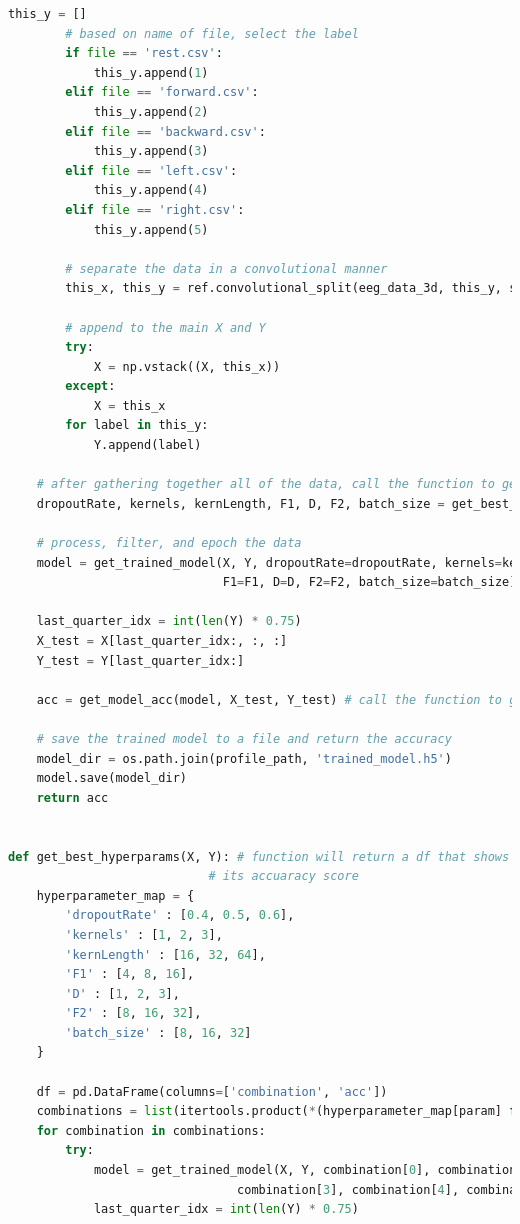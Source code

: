 \documentclass[conference]{IEEEtran}
\begin{document}
\begin{lstlisting}[language=Python, caption=Machine Learning Calls, label=ml_calls]
        this_y = []
        # based on name of file, select the label
        if file == 'rest.csv':
            this_y.append(1)
        elif file == 'forward.csv':
            this_y.append(2)
        elif file == 'backward.csv':
            this_y.append(3)
        elif file == 'left.csv':
            this_y.append(4)
        elif file == 'right.csv':
            this_y.append(5)

        # separate the data in a convolutional manner
        this_x, this_y = ref.convolutional_split(eeg_data_3d, this_y, samples_to_jump_by, num_samples, num_channels)

        # append to the main X and Y
        try:  
            X = np.vstack((X, this_x))
        except:
            X = this_x
        for label in this_y:
            Y.append(label)

    # after gathering together all of the data, call the function to get the best hyperparams
    dropoutRate, kernels, kernLength, F1, D, F2, batch_size = get_best_hyperparams(X, Y)
    
    # process, filter, and epoch the data 
    model = get_trained_model(X, Y, dropoutRate=dropoutRate, kernels=kernels, kernLength=kernLength,
                              F1=F1, D=D, F2=F2, batch_size=batch_size) # call the function to train the model
    
    last_quarter_idx = int(len(Y) * 0.75)
    X_test = X[last_quarter_idx:, :, :]
    Y_test = Y[last_quarter_idx:]
    
    acc = get_model_acc(model, X_test, Y_test) # call the function to get the acc

    # save the trained model to a file and return the accuracy
    model_dir = os.path.join(profile_path, 'trained_model.h5')
    model.save(model_dir)
    return acc


def get_best_hyperparams(X, Y): # function will return a df that shows every combination of hyperparam and 
                            # its accuaracy score
    hyperparameter_map = {
        'dropoutRate' : [0.4, 0.5, 0.6],
        'kernels' : [1, 2, 3],
        'kernLength' : [16, 32, 64],
        'F1' : [4, 8, 16],
        'D' : [1, 2, 3],
        'F2' : [8, 16, 32],
        'batch_size' : [8, 16, 32]
    }
    
    df = pd.DataFrame(columns=['combination', 'acc'])
    combinations = list(itertools.product(*(hyperparameter_map[param] for param in hyperparameter_map)))
    for combination in combinations:
        try:
            model = get_trained_model(X, Y, combination[0], combination[1], combination[2],
                                combination[3], combination[4], combination[5], combination[6])
            last_quarter_idx = int(len(Y) * 0.75)


\end{lstlisting}
\end{document}
